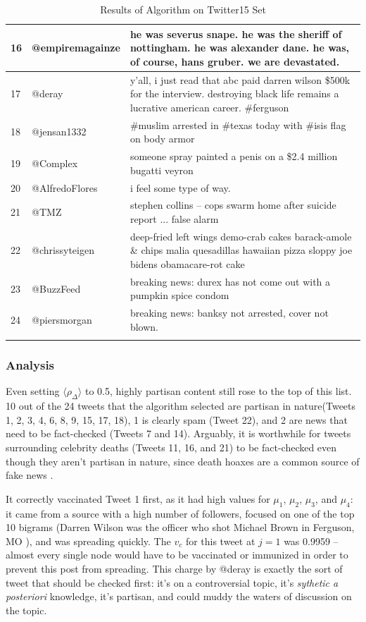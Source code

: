 \documentclass[preprint,review,12pt]{elsarticle}
\begin{document}
\begin{longtable}{ |p{0.5cm}|p{4.1cm}|p{12cm}|  }
\hline
16 & @empiremagainze & he was severus snape. he was the sheriff of nottingham. he was alexander dane. he was, of course, hans gruber. we are devastated. \\
\hline
17 & @deray & y'all, i just read that abc paid darren wilson \$500k for the interview. destroying black life remains a lucrative american career. \#ferguson \\
\hline
18 & @jensan1332 & \#muslim arrested in \#texas today with \#isis flag on body armor \\
\hline
19 & @Complex & someone spray painted a penis on a \$2.4 million bugatti veyron \\
\hline
20 &@AlfredoFlores & i feel some type of way. \\
\hline
21 & @TMZ & stephen collins -- cops swarm home after suicide report ... false alarm \\
\hline
22 & @chrissyteigen & deep-fried left wings demo-crab cakes barack-amole \& chips malia quesadillas hawaiian pizza sloppy joe bidens obamacare-rot cake \\
\hline
23 & @BuzzFeed & breaking news: durex has not come out with a pumpkin spice condom \\
\hline
24 & @piersmorgan& breaking news: banksy not arrested, cover not blown. \\

\hline
\caption{Results of Algorithm on Twitter15 Set}
\label{Results of Algorithm Twitter15}
\end{longtable}

\subsubsection{Analysis}
Even setting $\langle \rho_{\Delta} \rangle$ to 0.5, highly partisan content still rose to the top of this list. 10 out of the 24 tweets that the algorithm selected are partisan in nature(Tweets 1, 2, 3, 4, 6, 8, 9, 15, 17, 18), 1 is clearly spam (Tweet 22), and 2 are news that need to be fact-checked (Tweets 7 and 14). Arguably, it is worthwhile for tweets surrounding celebrity deaths (Tweets 11, 16, and 21) to be fact-checked even though they aren't partisan in nature, since death hoaxes are a common source of fake news \cite{moses2017celebrity}.

It correctly vaccinated Tweet 1 first, as it had high values for $\mu_1$, $\mu_2$, $\mu_3$, and $\mu_4$: it came from a source with a high number of followers, focused on one of the top 10 bigrams (Darren Wilson was the officer who shot Michael Brown in Ferguson, MO \cite{halpern2015cop}), and was spreading quickly. The $v_c$ for this tweet at $j=1$ was 0.9959 -- almost every single node would have to be vaccinated or immunized in order to prevent this post from spreading. This charge by @deray is exactly the sort of tweet that should be checked first: it's on a controversial topic, it's \textit{sythetic a posteriori} knowledge, it's partisan, and could muddy the waters of discussion on the topic. 
\end{document}
